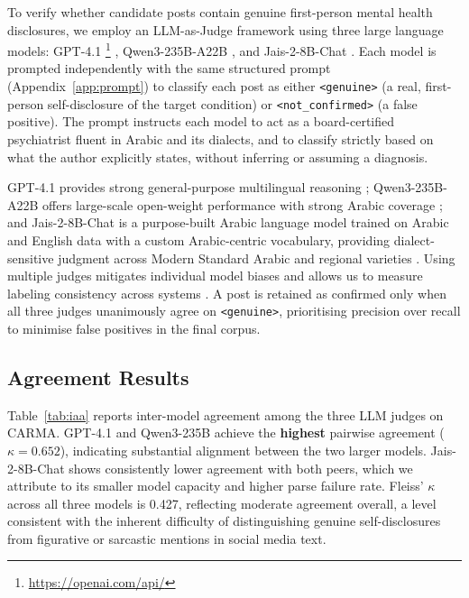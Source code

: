 \documentclass[11pt]{article}
\begin{document}
To verify whether candidate posts contain genuine first-person mental
health disclosures, we employ an LLM-as-Judge framework
\cite{zheng2023judging} using three large language models: GPT-4.1
\footnote{\url{https://openai.com/api/}} \cite{achiam2023gpt},
Qwen3-235B-A22B \cite{qwen3technicalreport}, and Jais-2-8B-Chat
\cite{jais2_2025}. Each model is prompted independently with the same
structured prompt (Appendix~\ref{app:prompt}) to classify each post as
either \texttt{<genuine>} (a real, first-person self-disclosure of the
target condition) or \texttt{<not\_confirmed>} (a false positive). The
prompt instructs each model to act as a board-certified psychiatrist
fluent in Arabic and its dialects, and to classify strictly based on
what the author explicitly states, without inferring or assuming a
diagnosis.

GPT-4.1 provides strong general-purpose multilingual reasoning
\cite{zhong2024agieval, moell2024comparing}; Qwen3-235B-A22B offers
large-scale open-weight performance with strong Arabic coverage
\cite{qwen3technicalreport}; and Jais-2-8B-Chat is a purpose-built
Arabic language model trained on Arabic and English data with a custom
Arabic-centric vocabulary, providing dialect-sensitive judgment across
Modern Standard Arabic and regional varieties \cite{jais2_2025}.
Using multiple judges mitigates individual model biases and allows us to
measure labeling consistency across systems \cite{zheng2023judging}.
A post is retained as confirmed only when all three judges unanimously
agree on \texttt{<genuine>}, prioritising precision over recall to
minimise false positives in the final corpus.

\subsection{Agreement Results}
\label{subsec:agreement}

Table~\ref{tab:iaa} reports inter-model agreement among the three LLM
judges on CARMA. GPT-4.1 and Qwen3-235B achieve the \textbf{highest}
pairwise agreement ($\kappa = 0.652$), indicating substantial alignment
between the two larger models. Jais-2-8B-Chat shows consistently lower
agreement with both peers, which we attribute to its smaller model capacity
\cite{wei2022emergent} and higher parse failure rate. Fleiss' $\kappa$
across all three models is 0.427, reflecting moderate agreement overall,
a level consistent with the inherent difficulty of distinguishing genuine
self-disclosures from figurative or sarcastic mentions in social media text.
\end{document}
